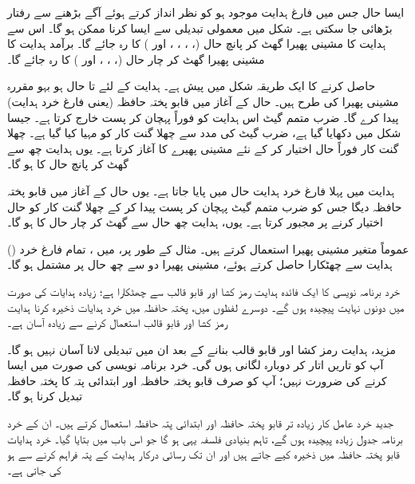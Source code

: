 ایسا  حال جس میں فارغ  ہدایت موجود ہو کو  نظر انداز کرتے ہوئے آگے بڑھنے  سے رفتار بڑھائی جا سکتی ہے۔ شکل  میں معمولی تبدیلی سے ایسا کرنا ممکن ہو گا۔ اس سے  ہدایت کا  مشینی پھیرا  گھٹ کر پانچ  حال  (، ، ، ، اور ) کا رہ جائے گا۔ برآمد ہدایت کا مشینی پھیرا گھٹ کر چار  حال   (، ، ، اور  ) کا رہ جائے گا۔

 حاصل کرنے کا ایک طریقہ شکل   میں  پیش ہے۔   ہدایت کے لئے  تا  حال  ہو بہو مقررہ مشینی پھیرا کی طرح ہیں۔   حال  کے آغاز  میں  قابو پختہ حافظہ  (یعنی فارغ خرد ہدایت)  پیدا کرے گا۔ ضرب متمم گیٹ اس ہدایت کو فوراً پہچان کر  پست   خارج کرتا ہے۔ جیسا شکل  میں دکھایا گیا ہے،  ضرب گیٹ کی مدد سے   چھلا گنت کار کو مہیا کیا گیا ہے۔ چھلا گنت کار فوراً  حال  اختیار کر کے  نئے مشینی پھیرے کا آغاز کرتا ہے۔ یوں  ہدایت چھ   سے  گھٹ کر پانچ حال   کا ہو گا۔

 ہدایت میں پہلا فارغ خرد ہدایت  حال میں پایا جاتا ہے۔ یوں  حال کے آغاز میں  قابو پختہ حافظہ  دیگا جس کو ضرب متمم گیٹ پہچان کر پست   پیدا کر  کے چھلا گنت کار کو  حال اختیار کرنے پر مجبور کرتا ہے۔ یوں،  ہدایت  چھ حال سے گھٹ کر چار حال کا ہو گا۔

() عموماً متغیر مشینی پھیرا  استعمال کرتے ہیں۔ مثال کے طور پر،  میں ، تمام فارغ خرد ہدایت سے چھٹکارا حاصل کرتے ہوئے،  مشینی پھیرا  دو سے چھ  حال پر مشتمل ہو  گا۔

خرد برنامہ نویسی کا ایک فائدہ  ہدایت رمز کشا اور قابو قالب سے چھٹکارا ہے؛ زیادہ ہدایات کی صورت میں دونوں نہایت پیچیدہ ہوں گے۔ دوسرے لفظوں میں، پختہ حافظہ میں  خرد ہدایات ذخیرہ کرنا ہدایت رمز کشا اور قابو قالب استعمال کرنے سے  زیادہ آسان ہے۔

مزید، ہدایت رمز کشا اور قابو قالب بنانے کے بعد ان میں تبدیلی لانا  آسان نہیں ہو گا۔ آپ کو  تاریں اتار کر دوبارہ لگانی ہوں گی۔ خرد برنامہ نویسی کی صورت میں ایسا کرنے کی ضرورت نہیں؛ آپ کو صرف قابو پختہ حافظہ  اور ابتدائی پتہ کا پختہ حافظہ تبدیل کرنا ہو گا۔

 جدید  خرد عامل کار  زیادہ تر قابو  پختہ   حافظہ اور ابتدائی پتہ حافظہ   استعمال کرتے ہیں۔ ان کے خرد برنامہ جدول زیادہ پیچیدہ ہوں گے، تاہم بنیادی فلسفہ یہی ہو گا جو اس باب میں بتایا گیا۔ خرد ہدایات قابو پختہ حافظہ میں ذخیرہ  کیے جاتے ہیں اور ان تک رسائی درکار ہدایت کے پتہ فراہم کرنے سے  ہو کی جاتی ہے۔
 
